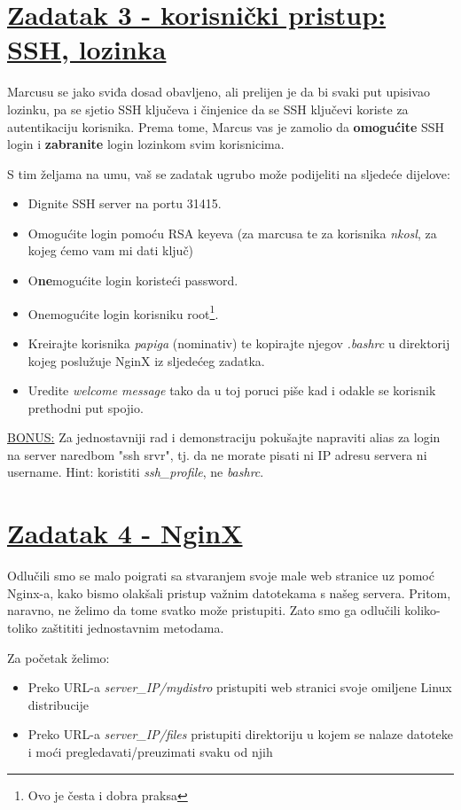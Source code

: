 \documentclass[12pt,a4paper]{article}
\begin{document}
	\newpage

	\section*{\underline{Zadatak 3 - korisnički pristup: SSH, lozinka}}
		Marcusu se jako sviđa dosad obavljeno, ali prelijen je da bi svaki put upisivao lozinku, pa se sjetio SSH ključeva i činjenice da se SSH ključevi koriste za autentikaciju korisnika. Prema tome, Marcus vas je zamolio da \textbf{omogućite} SSH login i \textbf{zabranite} login lozinkom svim korisnicima.
		\par S tim željama na umu, vaš se zadatak ugrubo može podijeliti na sljedeće dijelove:
		\begin{itemize}
			\item Dignite SSH server na portu 31415.
			\item Omogućite login pomoću RSA keyeva (za marcusa te za korisnika \textit{nkosl}, za kojeg ćemo vam mi dati ključ) 
			\item O\textbf{ne}mogućite login koristeći password. 
			\item Onemogućite login korisniku root\footnote{Ovo je česta i dobra praksa}.
			\item Kreirajte korisnika \textit{papiga} (nominativ) te kopirajte njegov \textit{.bashrc} u direktorij kojeg poslužuje NginX iz sljedećeg zadatka.
			\item Uredite \textit{welcome message} tako da u toj poruci piše kad i odakle se korisnik prethodni put spojio.  
		\end{itemize}
		\underline{BONUS:} Za jednostavniji rad i demonstraciju pokušajte napraviti alias za login na server naredbom "ssh srvr", tj. da ne morate pisati ni IP adresu servera ni username.
		Hint: koristiti \textit{ssh\_profile}, ne \textit{bashrc}.


		\newpage

		\section*{\underline{Zadatak 4 - NginX}}
		Odlučili smo se malo poigrati sa stvaranjem svoje male web stranice uz pomoć Nginx-a, kako bismo olakšali pristup važnim datotekama s našeg servera. Pritom, naravno, ne želimo da tome svatko može pristupiti. Zato smo ga odlučili koliko-toliko zaštititi jednostavnim metodama.

		\par Za početak želimo:
		\begin{itemize}
			\item Preko URL-a \textit{server\_IP/mydistro} pristupiti web stranici svoje omiljene Linux distribucije
			\item Preko URL-a \textit{server\_IP/files} pristupiti direktoriju u kojem se nalaze datoteke i moći pregledavati/preuzimati svaku od njih
		\end{itemize}
\end{document}

